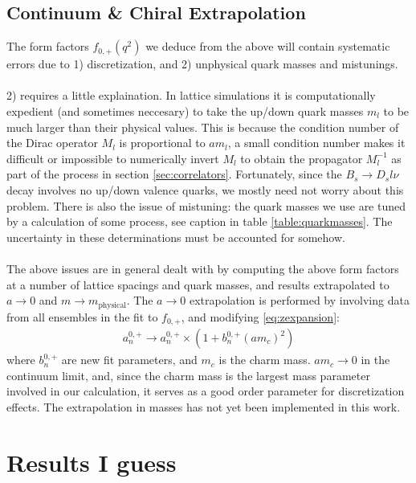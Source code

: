\subsection{Continuum \& Chiral Extrapolation}

The form factors $f_{0,+}(q^2)$ we deduce from the above will contain systematic errors due to 1) discretization, and 2) unphysical quark masses and mistunings. 
\\ \\
2) requires a little explaination. In lattice simulations it is computationally expedient (and sometimes neccesary) to take the up/down quark masses $m_l$ to be much larger than their physical values. This is because the condition number of the Dirac operator $M_l$ is proportional to $am_l$, a small condition number makes it difficult or impossible to numerically invert $M_l$ to obtain the propagator $M^{-1}_l$ as part of the process in section \ref{sec:correlators}. Fortunately, since the $B_s\to D_s l\nu$ decay involves no up/down valence quarks, we mostly need not worry about this problem. There is also the issue of mistuning: the quark masses we use are tuned by a calculation of some process, see caption in table \ref{table:quarkmasses}. The uncertainty in these determinations must be accounted for somehow.
\\ \\
The above issues are in general dealt with by computing the above form factors at a number of lattice spacings and quark masses, and results extrapolated to $a\to 0$ and $m\to m_{\text{physical}}$. The $a\to 0$ extrapolation is performed by involving data from all ensembles in the fit to $f_{0,+}$, and modifying \eqref{eq:zexpansion}:
\begin{align}
	a^{0,+}_n \to a^{0,+}_n \times ( 1 + b^{0,+}_n (am_c)^2 )
\end{align}
where $b^{0,+}_n$ are new fit parameters, and $m_c$ is the charm mass. $am_c\to0$ in the continuum limit, and, since the charm mass is the largest mass parameter involved in our calculation, it serves as a good order parameter for discretization effects. The extrapolation in masses has not yet been implemented in this work.

\section{Results I guess}
\label{sec:nrqcd}

